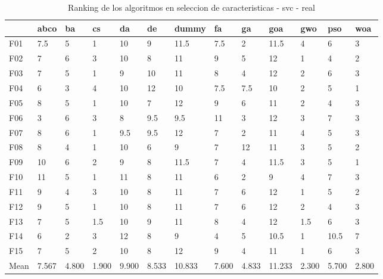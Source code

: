 \begin{table}
    \centering
    \begin{adjustbox}{width=\linewidth}
        \begin{tabular}{lllllllllllll}
            \toprule
            {}   & abco  & ba    & cs    & da    & de    & dummy  & fa    & ga    & goa    & gwo   & pso   & woa   \\
            \midrule
            F01  & 7.5   & 5     & 1     & 10    & 9     & 11.5   & 7.5   & 2     & 11.5   & 4     & 6     & 3     \\
            F02  & 7     & 6     & 3     & 10    & 8     & 11     & 9     & 5     & 12     & 1     & 4     & 2     \\
            F03  & 7     & 5     & 1     & 9     & 10    & 11     & 8     & 4     & 12     & 2     & 6     & 3     \\
            F04  & 6     & 3     & 4     & 10    & 12    & 10     & 7.5   & 7.5   & 10     & 2     & 5     & 1     \\
            F05  & 8     & 5     & 1     & 10    & 7     & 12     & 9     & 6     & 11     & 2     & 4     & 3     \\
            F06  & 3     & 6     & 3     & 8     & 9.5   & 9.5    & 11    & 3     & 12     & 3     & 7     & 3     \\
            F07  & 8     & 6     & 1     & 9.5   & 9.5   & 12     & 7     & 2     & 11     & 4     & 5     & 3     \\
            F08  & 8     & 4     & 1     & 10    & 6     & 9      & 7     & 12    & 11     & 3     & 5     & 2     \\
            F09  & 10    & 6     & 2     & 9     & 8     & 11.5   & 7     & 4     & 11.5   & 3     & 5     & 1     \\
            F10  & 11    & 5     & 1     & 11    & 8     & 11     & 6     & 2     & 9      & 4     & 7     & 3     \\
            F11  & 9     & 4     & 3     & 10    & 8     & 11     & 7     & 6     & 12     & 1     & 5     & 2     \\
            F12  & 9     & 5     & 1     & 10    & 8     & 11     & 7     & 6     & 12     & 2     & 4     & 3     \\
            F13  & 7     & 5     & 1.5   & 10    & 9     & 11     & 8     & 4     & 12     & 1.5   & 6     & 3     \\
            F14  & 6     & 2     & 3     & 12    & 8     & 9      & 4     & 5     & 10.5   & 1     & 10.5  & 7     \\
            F15  & 7     & 5     & 2     & 10    & 8     & 12     & 9     & 4     & 11     & 1     & 6     & 3     \\
            Mean & 7.567 & 4.800 & 1.900 & 9.900 & 8.533 & 10.833 & 7.600 & 4.833 & 11.233 & 2.300 & 5.700 & 2.800 \\
            \bottomrule
        \end{tabular}
    \end{adjustbox}
    \caption{Ranking de los algoritmos en seleccion de caracteristicas - svc - real}
    \label{tab:ranking_sel_rate_real_svc}
\end{table}



